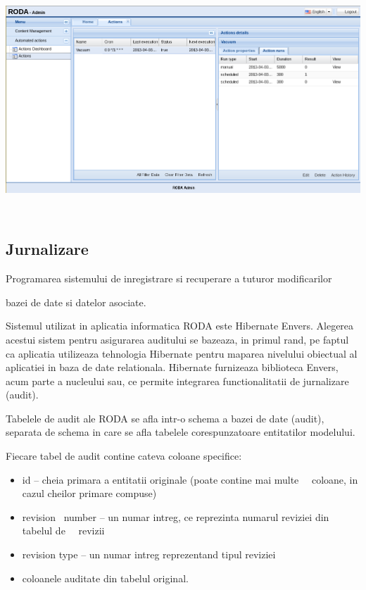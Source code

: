 \documentclass[a4paper, 10pt]{article}
\begin{document}
{\bigskip

\begin{center}
\includegraphics[width=6.5in,height=3.4307in]{RezumatRODAfaza5-img/RezumatRODAfaza5-img001.png}
\end{center}
 

\subsection*{Jurnalizare}

\bigskip

Programarea sistemului de inregistrare si recuperare a tuturor modificarilor

bazei de date si datelor asociate.


\bigskip

Sistemul utilizat in aplicatia informatica RODA este Hibernate Envers. Alegerea acestui sistem pentru asigurarea auditului se bazeaza, in primul rand, pe faptul ca aplicatia utilizeaza tehnologia Hibernate pentru maparea nivelului obiectual al aplicatiei in baza de date relationala. Hibernate furnizeaza biblioteca Envers, acum parte a nucleului sau, ce permite integrarea functionalitatii de jurnalizare (audit).


\bigskip

Tabelele de audit ale RODA se afla intr-o schema a bazei de date (audit), separata de schema in care se afla tabelele corespunzatoare entitatilor modelului.


\bigskip

Fiecare tabel de audit contine cateva coloane specifice:

\begin{itemize}
\item id -- cheia primara a entitatii originale (poate contine mai multe \ \ coloane, in cazul cheilor primare compuse)
\item revision \ number -- un numar intreg, ce reprezinta numarul reviziei din tabelul de \ \ revizii
\item revision type -- un numar intreg reprezentand tipul reviziei
\item coloanele auditate din tabelul original.
\end{itemize}

}
\end{document}
